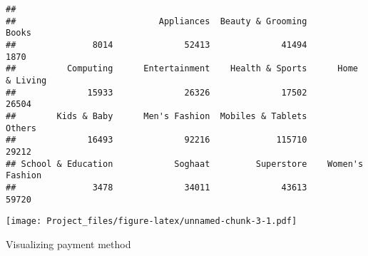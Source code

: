 \documentclass[
]{article}
\newenvironment{Shaded}{\begin{snugshade}}{\end{snugshade}}
\newcommand{\CommentTok}[1]{\textcolor[rgb]{0.56,0.35,0.01}{\textit{#1}}}
\newcommand{\DataTypeTok}[1]{\textcolor[rgb]{0.13,0.29,0.53}{#1}}
\newcommand{\DecValTok}[1]{\textcolor[rgb]{0.00,0.00,0.81}{#1}}
\newcommand{\FloatTok}[1]{\textcolor[rgb]{0.00,0.00,0.81}{#1}}
\newcommand{\KeywordTok}[1]{\textcolor[rgb]{0.13,0.29,0.53}{\textbf{#1}}}
\newcommand{\NormalTok}[1]{#1}
\newcommand{\OperatorTok}[1]{\textcolor[rgb]{0.81,0.36,0.00}{\textbf{#1}}}
\newcommand{\StringTok}[1]{\textcolor[rgb]{0.31,0.60,0.02}{#1}}
\begin{document}
\begin{verbatim}
## 
##                            Appliances  Beauty & Grooming              Books 
##               8014              52413              41494               1870 
##          Computing      Entertainment    Health & Sports      Home & Living 
##              15933              26326              17502              26504 
##        Kids & Baby      Men's Fashion  Mobiles & Tablets             Others 
##              16493              92216             115710              29212 
## School & Education            Soghaat         Superstore    Women's Fashion 
##               3478              34011              43613              59720
\end{verbatim}

\begin{Shaded}
\end{Shaded}

\texttt{[image: Project\_files/figure-latex/unnamed-chunk-3-1.pdf]}

Visualizing payment method

\begin{Shaded}
\end{Shaded}
\end{document}
